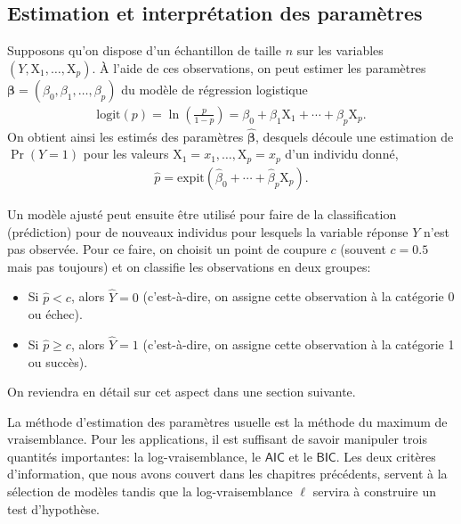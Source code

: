 \documentclass[
  11pt,
  letterpaper,
]{scrbook}
\providecommand{\tightlist}{%
  \setlength{\itemsep}{0pt}\setlength{\parskip}{0pt}}\usepackage{longtable,booktabs,array}
\theoremstyle{definition}
\theoremstyle{remark}
\begin{document}
\hypertarget{estimation-et-interpruxe9tation-des-paramuxe8tres}{%
\subsection{Estimation et interprétation des
paramètres}\label{estimation-et-interpruxe9tation-des-paramuxe8tres}}

Supposons qu'on dispose d'un échantillon de taille \(n\) sur les
variables \((Y, \mathrm{X}_1, \ldots, \mathrm{X}_p)\). À l'aide de ces
observations, on peut estimer les paramètres
\(\boldsymbol{\beta} = (\beta_0, \beta_1 ,\ldots, \beta_p)\) du modèle
de régression logistique \begin{align*}
\textrm{logit}(p) = \ln \left( \frac{p}{1-p}\right) = \beta_0 + \beta_1 \mathrm{X}_1 + \cdots + \beta_p\mathrm{X}_p.
\end{align*} On obtient ainsi les estimés des paramètres
\(\widehat{\boldsymbol{\beta}}\), desquels découle une estimation de
\(\Pr(Y=1)\) pour les valeurs
\(\mathrm{X}_1=x_1, \ldots, \mathrm{X}_p=x_p\) d'un individu donné,
\begin{align*}
 \widehat{p} = \textrm{expit}(\widehat{\beta}_0 + \cdots + \widehat{\beta}_p\mathrm{X}_p).
\end{align*}

Un modèle ajusté peut ensuite être utilisé pour faire de la
classification (prédiction) pour de nouveaux individus pour lesquels la
variable réponse \(Y\) n'est pas observée. Pour ce faire, on choisit un
point de coupure \(c\) (souvent \(c=0.5\) mais pas toujours) et on
classifie les observations en deux groupes:

\begin{itemize}
\tightlist
\item
  Si \(\widehat{p}< c\), alors \(\widehat{Y}=0\) (c'est-à-dire, on
  assigne cette observation à la catégorie 0 ou échec).
\item
  Si \(\widehat{p} \geq c\), alors \(\widehat{Y}=1\) (c'est-à-dire, on
  assigne cette observation à la catégorie 1 ou succès).
\end{itemize}

On reviendra en détail sur cet aspect dans une section suivante.

La méthode d'estimation des paramètres usuelle est la méthode du maximum
de vraisemblance. Pour les applications, il est suffisant de savoir
manipuler trois quantités importantes: la log-vraisemblance, le
\(\mathsf{AIC}\) et le \(\mathsf{BIC}\). Les deux critères
d'information, que nous avons couvert dans les chapitres précédents,
servent à la sélection de modèles tandis que la log-vraisemblance
\(\ell\) servira à construire un test d'hypothèse.
\end{document}
